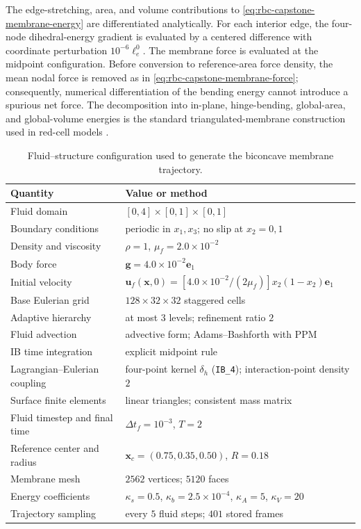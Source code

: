 \documentclass[a4paper,fleqn]{cas-sc}
\begin{document}
The edge-stretching, area, and volume contributions to
\eqref{eq:rbc-capstone-membrane-energy} are differentiated analytically.  For
each interior edge, the four-node dihedral-energy gradient is evaluated by a
centered difference with coordinate perturbation \(10^{-6}\ell_e^0\).  The
membrane force is evaluated at the midpoint configuration.  Before conversion
to reference-area force density, the mean nodal force is removed as in
\eqref{eq:rbc-capstone-membrane-force}; consequently, numerical differentiation
of the bending energy cannot introduce a spurious net force.  The decomposition
into in-plane, hinge-bending, global-area, and global-volume energies is the
standard triangulated-membrane construction used in red-cell models
\cite{FedosovCaswellKarniadakis2010RBC}.

\begin{table}[p]
\centering
\caption{Fluid--structure configuration used to generate the biconcave
membrane trajectory.}
\label{tab:rbc-fsi-parameters}
\small
\setlength{\tabcolsep}{5pt}
\begin{tabular}{p{} p{}}
\toprule
Quantity & Value or method \\
\midrule
Fluid domain & \([0,4]\times[0,1]\times[0,1]\) \\
Boundary conditions & periodic in \(x_1,x_3\); no slip at \(x_2=0,1\) \\
Density and viscosity & \(\rho=1\), \(\mu_f=2.0\times10^{-2}\) \\
Body force & \(\bm g=4.0\times10^{-2}\bm e_1\) \\
Initial velocity & \(\bm u_f(\bm x,0)=
  [4.0\times10^{-2}/(2\mu_f)]x_2(1-x_2)\bm e_1\) \\
Base Eulerian grid & \(128\times32\times32\) staggered cells \\
Adaptive hierarchy & at most \(3\) levels; refinement ratio \(2\) \\
Fluid advection & advective form; Adams--Bashforth with PPM \\
IB time integration & explicit midpoint rule \\
Lagrangian--Eulerian coupling & four-point kernel \(\delta_h\)
  (\texttt{IB\_4}); interaction-point density \(2\) \\
Surface finite elements & linear triangles; consistent mass matrix \\
Fluid timestep and final time & \(\Delta t_f=10^{-3}\), \(T=2\) \\
Reference center and radius & \(\bm x_c=(0.75,0.35,0.50)\), \(R=0.18\) \\
Membrane mesh & \(2562\) vertices; \(5120\) faces \\
Energy coefficients & \(\kappa_s=0.5\),
  \(\kappa_b=2.5\times10^{-4}\), \(\kappa_A=5\), \(\kappa_V=20\) \\
Trajectory sampling & every \(5\) fluid steps; \(401\) stored frames \\
\bottomrule
\end{tabular}
\end{table}
\end{document}
